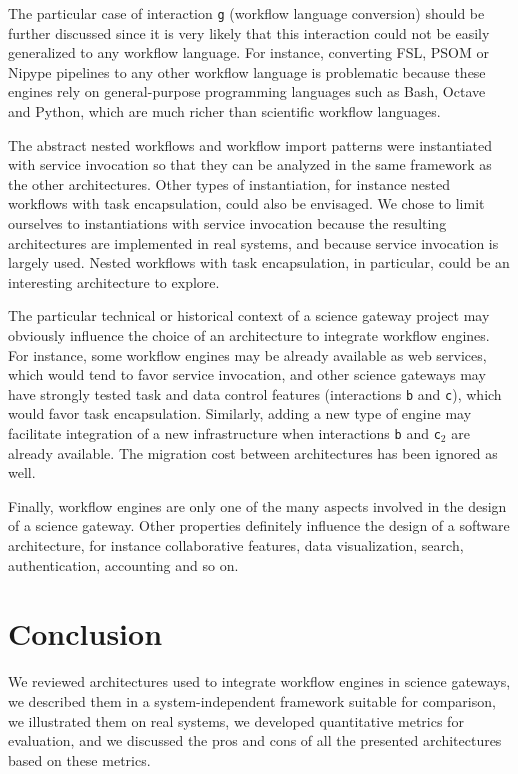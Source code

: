 \documentclass[preprint,3p,twocolumn]{elsarticle}
\newcommand{\closedanswerednote}[6]{}
\begin{document}
The particular case of interaction \texttt{g} (workflow language
conversion) should be further discussed since it is very likely that
this interaction could not be easily generalized to any workflow
language. For instance, converting FSL, PSOM or Nipype pipelines to
any other workflow language is problematic because these engines rely
on general-purpose programming languages such as Bash, Octave and
Python, which are much richer than scientific workflow languages.

The abstract nested workflows and workflow import patterns were
instantiated with service invocation so that they can be analyzed in
the same framework as the other architectures. Other types of
instantiation, for instance nested workflows with task encapsulation, could
also be envisaged. We chose to limit ourselves to instantiations with
service invocation because the resulting architectures are implemented
in real systems, and because service invocation is largely
used. Nested workflows with task encapsulation, in particular, could be an
interesting architecture to explore.

The particular technical or historical context of a science gateway
project may obviously influence the choice of an architecture to
integrate workflow engines. For instance, some workflow engines may be
already available as web services, which would tend to favor service
invocation, and other science gateways may have strongly tested task
and data control features (interactions \texttt{b} and \texttt{c}),
which would favor task encapsulation. Similarly, adding a new type of engine
may facilitate integration of a new infrastructure when interactions
\texttt{b} and \texttt{c$_2$} are already available. The migration
cost between architectures has been ignored as well.

Finally, workflow engines are only one of the many aspects involved in
the design of a science gateway. Other properties definitely influence
the design of a software architecture, for instance collaborative
features, data visualization, search, authentication, accounting and
so on.

\section{Conclusion}

We reviewed architectures used to integrate workflow engines in
science gateways, we described them in a system-independent framework
suitable for comparison, we illustrated them on real systems, we
developed quantitative metrics for evaluation, and we discussed the
pros and cons of all the presented architectures based on these metrics.
\closedanswerednote{Rafael}{One thing that is missing in the
  conclusion or the limitations section is to state that this work
  does not intend to quantify the amount of work required to develop
  science gateways using a specific architecture, but the goal is to
  highlight what are the main components and interactions for each
  architecture, and the main advantages and drawbacks. This should
  also be stated in the introduction.}{Tristan}{This is in
  contradiction with the metric on 'integration effort'. What do you
  think?}{Tristan}{Fixed, as discussed in github \#8.}
\end{document}
